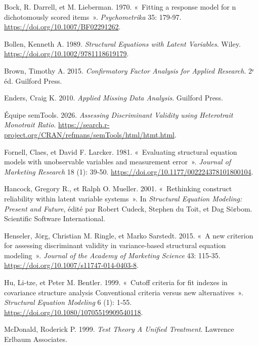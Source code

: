 \documentclass[
  french,
  11pt,
  a4paper,
  DIV=11,
  numbers=noendperiod]{scrreprt}
\newlength{\cslhangindent}
\newenvironment{CSLReferences}[2] %
 {\begin{list}{}{%
  \setlength{\itemindent}{0pt}
  \setlength{\leftmargin}{0pt}
  \setlength{\parsep}{0pt}
  \ifodd #1
   \setlength{\leftmargin}{\cslhangindent}
   \setlength{\itemindent}{-1\cslhangindent}
  \fi
  \setlength{\itemsep}{#2\baselineskip}}}
 {\end{list}}
\begin{document}
\protect{}\label{refs}
\begin{CSLReferences}{1}{1}
Bock, R. Darrell, et M. Lieberman. 1970. {«~Fitting a response model for
n dichotomously scored items~»}. \emph{Psychometrika} 35: 179‑97.
\url{https://doi.org/10.1007/BF02291262}.

Bollen, Kenneth A. 1989. \emph{Structural Equations with Latent
Variables}. Wiley. \url{https://doi.org/10.1002/9781118619179}.

Brown, Timothy A. 2015. \emph{Confirmatory Factor Analysis for Applied
Research}. 2ᵉ éd. Guilford Press.

Enders, Craig K. 2010. \emph{Applied Missing Data Analysis}. Guilford
Press.

Équipe semTools. 2026. \emph{Assessing Discriminant Validity using
Heterotrait Monotrait Ratio}.
\url{https://search.r-project.org/CRAN/refmans/semTools/html/htmt.html}.

Fornell, Claes, et David F. Larcker. 1981. {«~Evaluating structural
equation models with unobservable variables and measurement error~»}.
\emph{Journal of Marketing Research} 18 (1): 39‑50.
\url{https://doi.org/10.1177/002224378101800104}.

Hancock, Gregory R., et Ralph O. Mueller. 2001. {«~Rethinking construct
reliability within latent variable systems~»}. In \emph{Structural
Equation Modeling: Present and Future}, édité par Robert Cudeck, Stephen
du Toit, et Dag Sörbom. Scientific Software International.

Henseler, Jörg, Christian M. Ringle, et Marko Sarstedt. 2015. {«~A new
criterion for assessing discriminant validity in variance-based
structural equation modeling~»}. \emph{Journal of the Academy of
Marketing Science} 43: 115‑35.
\url{https://doi.org/10.1007/s11747-014-0403-8}.

Hu, Li-tze, et Peter M. Bentler. 1999. {«~Cutoff criteria for fit
indexes in covariance structure analysis Conventional criteria versus
new alternatives~»}. \emph{Structural Equation Modeling} 6 (1): 1‑55.
\url{https://doi.org/10.1080/10705519909540118}.

McDonald, Roderick P. 1999. \emph{Test Theory A Unified Treatment}.
Lawrence Erlbaum Associates.


\end{CSLReferences}
\end{document}
